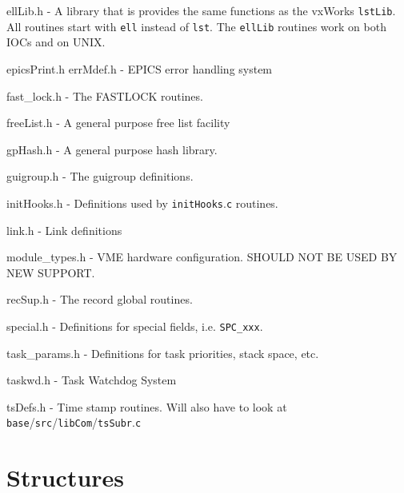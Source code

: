 ellLib.h - A library that is provides the same functions as the vxWorks \verb|lstLib|. All routines start with \verb|ell| instead of 
\verb|lst|.  The \verb|ellLib| routines work on both IOCs and on UNIX.

epicsPrint.h errMdef.h - EPICS error handling system

fast\_lock.h - The FASTLOCK routines.

freeList.h - A general purpose free list facility

gpHash.h - A general purpose hash library.

guigroup.h - The guigroup definitions.

initHooks.h - Definitions used by \verb|initHooks|.\verb|c| routines.

link.h - Link definitions

module\_types.h - VME hardware configuration. SHOULD NOT BE USED BY NEW SUPPORT.

recSup.h - The record global routines.

special.h - Definitions for special fields, i.e. \verb|SPC_xxx|.

task\_params.h - Definitions for task priorities, stack space, etc.

taskwd.h - Task Watchdog System

tsDefs.h - Time stamp routines. Will also have to look at \verb|base|/\verb|src|/\verb|libCom|/\verb|tsSubr|.\verb|c|

\section{Structures}










